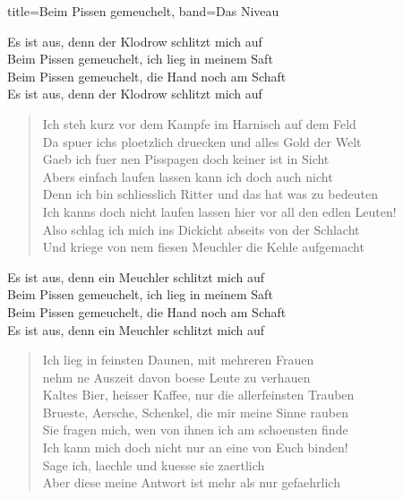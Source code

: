 \begin{song}{title=Beim Pissen gemeuchelt, band=Das Niveau}
        \begin{chorus}
            Es ist aus, denn der Klodrow schlitzt mich auf \\
            Beim Pissen gemeuchelt, ich lieg in meinem Saft \\
            Beim Pissen gemeuchelt, die Hand noch am Schaft \\
            Es ist aus, denn der Klodrow schlitzt mich auf \\
        \end{chorus}

        \newpage

        \begin{verse}
            Ich steh kurz vor dem Kampfe im Harnisch auf dem Feld \\
            Da spuer ichs ploetzlich druecken und alles Gold der Welt \\
            Gaeb ich fuer nen Pisspagen doch keiner ist in Sicht \\
            Abers einfach laufen lassen kann ich doch auch nicht \\
            Denn ich bin schliesslich Ritter und das hat was zu bedeuten \\
            Ich kanns doch nicht laufen lassen hier vor all den edlen Leuten! \\
            Also schlag ich mich ins Dickicht abseits von der Schlacht \\
            Und kriege von nem fiesen Meuchler die Kehle aufgemacht \\
        \end{verse}

        \begin{chorus}
            Es ist aus, denn ein Meuchler schlitzt mich auf \\
            Beim Pissen gemeuchelt, ich lieg in meinem Saft \\
            Beim Pissen gemeuchelt, die Hand noch am Schaft \\
            Es ist aus, denn ein Meuchler schlitzt mich auf \\
        \end{chorus}

        \begin{verse}
            Ich lieg in feinsten Daunen, mit mehreren Frauen \\
            nehm ne Auszeit davon boese Leute zu verhauen \\
            Kaltes Bier, heisser Kaffee, nur die allerfeinsten Trauben \\
            Brueste, Aersche, Schenkel, die mir meine Sinne rauben \\
            Sie fragen mich, wen von ihnen ich am schoensten finde \\
            Ich kann mich doch nicht nur an eine von Euch binden! \\
            Sage ich, laechle und kuesse sie zaertlich \\
            Aber diese meine Antwort ist mehr als nur gefaehrlich \\
        \end{verse}


\end{song}
